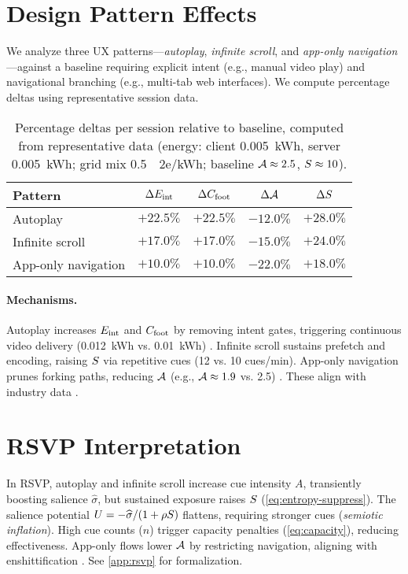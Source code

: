 \section{Design Pattern Effects}
\label{sec:pattern-effects}
We analyze three UX patterns---\emph{autoplay}, \emph{infinite scroll}, and \emph{app-only navigation}---against a baseline requiring explicit intent (e.g., manual video play) and navigational branching (e.g., multi-tab web interfaces). We compute percentage deltas using representative session data.

\begin{table}[h]
\centering
\begin{tabular}{lcccc}
\hline
\textbf{Pattern} & $\Delta E_{\mathrm{int}}$ & $\Delta C_{\mathrm{foot}}$ & $\Delta \mathcal{A}$ & $\Delta S$ \\
\hline
Autoplay & $+22.5\%$ & $+22.5\%$ & $-12.0\%$ & $+28.0\%$ \\
Infinite scroll & $+17.0\%$ & $+17.0\%$ & $-15.0\%$ & $+24.0\%$ \\
App-only navigation & $+10.0\%$ & $+10.0\%$ & $-22.0\%$ & $+18.0\%$ \\
\hline
\end{tabular}
\caption{Percentage deltas per session relative to baseline, computed from representative data (energy: client \SI{0.005}{\kWh}, server \SI{0.005}{\kWh}; grid mix \SI{0.5}{\kgCO2e/\kWh}; baseline $\mathcal{A} \approx 2.5$, $S \approx 10$).}
\label{tab:deltas}
\end{table}

\paragraph{Mechanisms.}
Autoplay increases \(E_{\mathrm{int}}\) and \(C_{\mathrm{foot}}\) by removing intent gates, triggering continuous video delivery (\SI{0.012}{\kWh} vs. \SI{0.01}{\kWh}) \citep{extentia2024}. Infinite scroll sustains prefetch and encoding, raising \(S\) via repetitive cues (12 vs. 10 cues/min). App-only navigation prunes forking paths, reducing \(\mathcal{A}\) (e.g., \(\mathcal{A} \approx 1.9\) vs. 2.5) \citep{doctorow2022}. These align with industry data \citep{colak2024}.

\section{RSVP Interpretation}
\label{sec:hidden-rsvp}
In RSVP, autoplay and infinite scroll increase cue intensity \(A\), transiently boosting salience \(\widehat{\sigma}\), but sustained exposure raises \(S\) (\cref{eq:entropy-suppress}). The salience potential \(U=-\widehat{\sigma}/(1+\rho S)\) flattens, requiring stronger cues (\emph{semiotic inflation}). High cue counts (\(n\)) trigger capacity penalties (\cref{eq:capacity}), reducing effectiveness. App-only flows lower \(\mathcal{A}\) by restricting navigation, aligning with enshittification \citep{doctorow2022}. See \cref{app:rsvp} for formalization.

